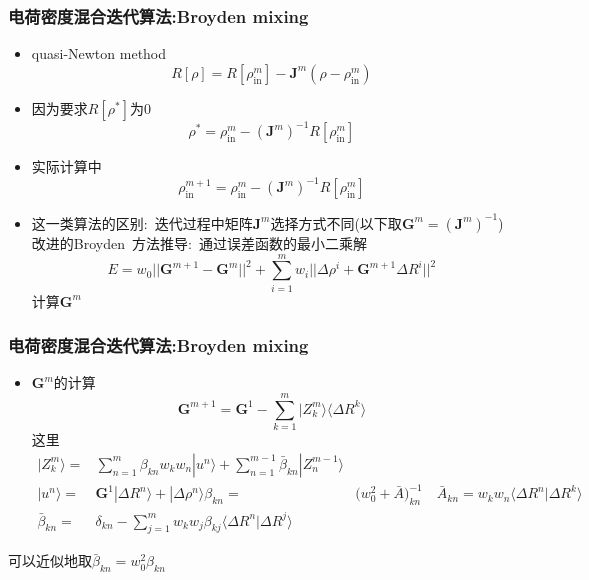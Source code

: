 \documentclass[cjk,slidestop,compress,mathserif,blue]{beamer}
\begin{document}
  \frame
  {
	  \frametitle{电荷密度混合迭代算法:\textrm{Broyden mixing}}
	  \begin{itemize}
		  \item \textrm{quasi-Newton method}
			  \begin{displaymath}
				  R[\rho]=R[\rho_{\mathrm{in}}^{m}]-\mathbf{J}^m(\rho-\rho_{\mathrm{in}}^{m})
			  \end{displaymath}
		  \item 因为要求$R[\rho^{\ast}]$为0
			  \begin{displaymath}
				  \rho^{\ast}=\rho_{\mathrm{in}}^{m}-(\mathbf{J}^m)^{-1}R[\rho_{\mathrm{in}}^{m}]
			  \end{displaymath}
		  \item 实际计算中
			  \begin{displaymath}
				  \rho_{\mathrm{in}}^{m+1}=\rho_{\mathrm{in}}^{m}-(\mathbf{J}^m)^{-1}R[\rho_{\mathrm{in}}^{m}]
			  \end{displaymath}
		  \item 这一类算法的区别:~迭代过程中矩阵$\mathbf{J}^m$选择方式不同(以下取$\mathbf{G}^m=(\mathbf{J}^m)^{-1}$)\\
			  改进的\textrm{Broyden~}方法推导:~通过误差函数的最小二乘解
			  \begin{displaymath}
				  E=w_0||\mathbf{G}^{m+1}-\mathbf{G}^m||^2+\sum_{i=1}^m w_i||\Delta\rho^i+\mathbf{G}^{m+1}\Delta R^i||^2
			  \end{displaymath}
			  计算$\mathbf{G}^m$
	  \end{itemize}
  }

  \frame
  {
	  \frametitle{电荷密度混合迭代算法:\textrm{Broyden mixing}}
	  \begin{itemize}
		  \item $\mathbf{G}^m$的计算
			  \begin{displaymath}
				  \mathbf{G}^{m+1}=\mathbf{G}^1-\sum_{k=1}^m|Z_k^m\rangle\langle\Delta R^k\rangle
			  \end{displaymath}
			  这里
			  \begin{displaymath}
				  \begin{aligned}
					  |Z_k^m\rangle=&\sum_{n=1}^m\beta_{kn}w_kw_n|u^n\rangle+\sum_{n=1}^{m-1}\bar\beta_{kn}|Z_n^{m-1}\rangle\\
					  |u^n\rangle=&\mathbf{G}^1|\Delta R^n\rangle+|\Delta\rho^n\rangle
					  \beta_{kn}=&\big(w_0^2+\bar{A}\big)_{kn}^{-1}\quad \bar{A}_{kn}=w_kw_n\langle\Delta R^n|\Delta R^k\rangle\\
					  \bar\beta_{kn}=&\delta_{kn}-\sum_{j=1}^mw_kw_j\beta_{kj}\langle\Delta R^n|\Delta R^j\rangle
				  \end{aligned}
			  \end{displaymath}
	  \end{itemize}
	  可以近似地取$\bar\beta_{kn}=w_0^2\beta_{kn}$
   }
\end{document}
